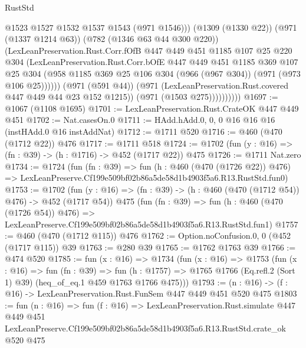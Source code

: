 \begin{lexlean}{RustStd}
\begin{coremodule}
                          @1523
                          @1527
                          @1532
                          @1537
                          @1543
                          (@971 @1546)))
                      (@1309 (@1330 @22))
                      (@971 (@1337 @1214 @63))
                      (@782 (@1346 @63 @44 @300 @220))
                      (LexLeanPreservation.Rust.Corr.fOfB
                        @447
                        @449
                        @451
                        @1185
                        @107
                        @25
                        @220
                        @304
                        (LexLeanPreservation.Rust.Corr.bOfE
                          @447
                          @449
                          @451
                          @1185
                          @369
                          @107
                          @25
                          @304
                          (@958
                            @1185
                            @369
                            @25
                            @106
                            @304
                            (@966 (@967 @304))
                            (@971 (@973 @106 @25))))))
                    (@971 (@591 @44))
                    (@971 (LexLeanPreservation.Rust.covered @447 @449 @44 @23 @152 @1215))
                    (@971 (@1503 @275))))))))))
@1697 := @1067 (@1108 @1695)
@1701 := LexLeanPreservation.Rust.CrateOK @447 @449 @451
@1702 := Nat.casesOn.{0}
@1711 := HAdd.hAdd.{0, 0, 0} @16 @16 @16 (instHAdd.{0} @16 instAddNat)
@1712 := @1711 @520
@1716 := @460 (@470 (@1712 @22)) @476
@1717 := @1711 @518
@1724 := @1702 (fun (y : @16) => (fn : @39) -> (h : @1716) -> @452 (@1717 @22)) @475
@1726 := @1711 Nat.zero
@1734 := @1724
    (fun (fn : @39) =>
    fun (h : @460 (@470 (@1726 @22)) @476) =>
    LexLeanPreserve.Cf199e509bf02b86a5de58d1b4903f5a6.R13.RustStd.fun0)
@1753 := @1702
    (fun (y : @16) => (fn : @39) -> (h : @460 (@470 (@1712 @54)) @476) -> @452 (@1717 @54))
    @475
    (fun (fn : @39) =>
    fun (h : @460 (@470 (@1726 @54)) @476) =>
    LexLeanPreserve.Cf199e509bf02b86a5de58d1b4903f5a6.R13.RustStd.fun1)
@1757 := @460 (@470 (@1712 @115)) @476
@1762 := Option.noConfusion.{0, 0} (@452 (@1717 @115)) @39
@1763 := @280 @39
@1765 := @1762 @1763 @39
@1766 := @474 @520
@1785 := fun (x : @16) =>
  @1734
    (fun (x : @16) =>
    @1753
      (fun (x : @16) =>
      fun (fn : @39) =>
      fun (h : @1757) =>
      @1765 @1766 (Eq.refl.{2} (Sort 1) @39) (heq_of_eq.{1} @459 @1763 @1766 @475)))
@1793 := (n : @16) -> (f : @16) -> LexLeanPreservation.Rust.FunSem @447 @449 @451 @520 @475
@1803 := fun (n : @16) =>
  fun (f : @16) =>
  LexLeanPreservation.Rust.simulate
    @447
    @449
    @451
    LexLeanPreserve.Cf199e509bf02b86a5de58d1b4903f5a6.R13.RustStd.crate_ok
    @520
    @475
\end{coremodule}
\end{lexlean}
